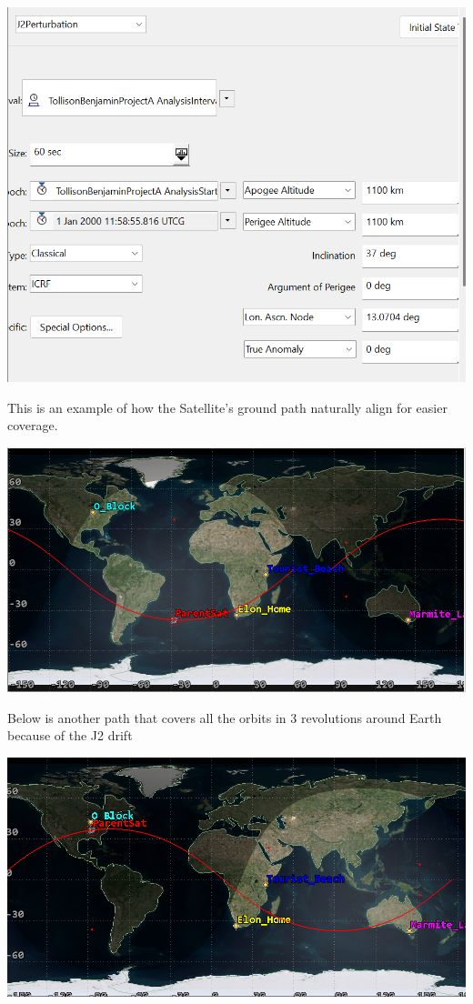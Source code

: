 \documentclass[a4paper, twoside]{article}
\begin{document}
\begin{center}
   \includegraphics{parent-sat.png}
\end{center}
This is an example of how the Satellite's ground path naturally align for easier coverage.
\begin{center}
  \includegraphics[width=\linewidth]{orbit-path-a.png} 
\end{center}
\pagebreak
Below is another path that covers all the orbits in 3 revolutions around Earth because of the J2 drift
\begin{center}
  \includegraphics[width=\linewidth]{orbit-path-b.png} 
\end{center}
\end{document}
